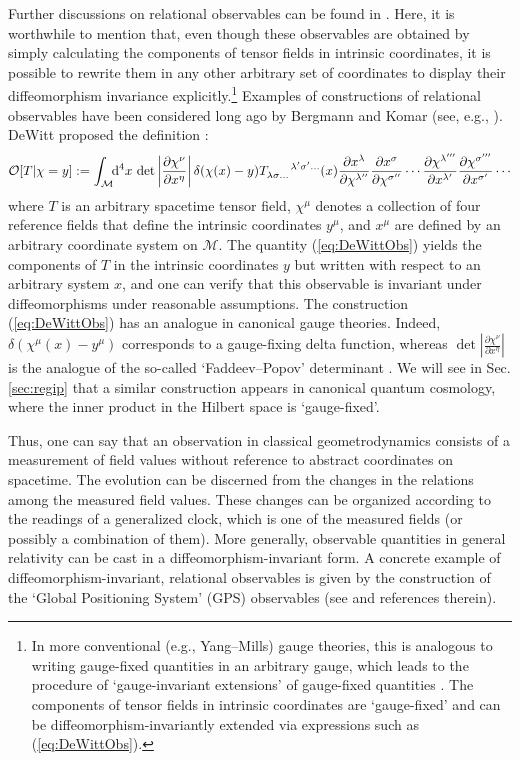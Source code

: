 \documentclass[12pt]{iopart}
\def\eq#1{\begin{equation}\begin{aligned}#1\end{aligned}\end{equation}}
\def\eref#1{(\ref{eq:#1})}
\def\D{\mathrm{d}}
\def\del#1#2{\frac{\partial#1}{\partial#2}}
\begin{document}
Further discussions on relational observables can be found in \cite{Dittrich:2005kc,Dittrich:2004cb,Dittrich:2006ee,Dittrich:2007jx,Tambornino:2011vg,Chataig:Thesis,Goeller:2022rsx}. Here, it is worthwhile to mention that, even though these observables are obtained by simply calculating the components of tensor fields in intrinsic coordinates, it is possible to rewrite them in any other arbitrary set of coordinates to display their diffeomorphism invariance explicitly.\footnote{In more conventional (e.g., Yang--Mills) gauge theories, this is analogous to writing gauge-fixed quantities in an arbitrary gauge, which leads to the procedure of `gauge-invariant extensions' of gauge-fixed quantities \citep{HT:book}. The components of tensor fields in intrinsic coordinates are `gauge-fixed' and can be diffeomorphism-invariantly extended via expressions such as \eref{DeWittObs}.} Examples of constructions of relational observables have been considered long ago by Bergmann and Komar (see, e.g., \cite{Komar:Motions,Komar:1958ymq,Bergmann:1960wb,Bergmann:1961wa,Komar:1971rg,Komar:1974ah}). DeWitt proposed the definition \citep{DeWitt:1962cg}:
\eq{\label{eq:DeWittObs}
\mathcal{O}[T|\chi = y] := \int_{\mathcal{M}}\!\!\D^4x\,\det\left|\frac{\partial \chi^{\nu}}{\partial x^{\eta}}\right|\delta(\chi(x)-y) \tensor{T}{_\lambda_\sigma_{\ldots}^{\lambda'\sigma'\ldots}}(x)\del{x^{\lambda}}{\chi^{\lambda''}}\del{x^{\sigma}}{\chi^{\sigma''}}\cdots\del{\chi^{\lambda'''}}{x^{\lambda'}}\del{\chi^{\sigma'''}}{x^{\sigma'}}\cdots
}
where $T$ is an arbitrary spacetime tensor field, $\chi^{\mu}$ denotes a collection of four reference fields that define the intrinsic coordinates $y^{\mu}$, and $x^{\mu}$ are defined by an arbitrary coordinate system on $\mathcal{M}$. The quantity \eref{DeWittObs} yields the components of $T$ in the intrinsic coordinates $y$ but written with respect to an arbitrary system $x$, and one can verify that this observable is invariant under diffeomorphisms under reasonable assumptions. The construction \eref{DeWittObs} has an analogue in canonical gauge theories. Indeed, $\delta(\chi^{\mu}(x)-y^{\mu})$ corresponds to a gauge-fixing delta function, whereas $\det\left|\frac{\partial \chi^{\nu}}{\partial x^{\eta}}\right|$ is the analogue of the so-called `Faddeev--Popov' determinant \citep{Faddeev:1967fc,Faddeev:1973zb,HT:book}. We will see in Sec. \ref{sec:regip} that a similar construction appears in canonical quantum cosmology, where the inner product in the Hilbert space is `gauge-fixed'.

Thus, one can say that an observation in classical geometrodynamics consists of a measurement of field values without reference to abstract coordinates on spacetime. The evolution can be discerned from the changes in the relations among the measured field values. These changes can be organized according to the readings of a generalized clock, which is one of the measured fields (or possibly a combination of them). More generally, observable quantities in general relativity can be cast in a diffeomorphism-invariant form. A concrete example of diffeomorphism-invariant, relational observables is given by the construction of the `Global Positioning System' (GPS) observables (see \cite{Rovelli:2001my,PhysRevD.65.044018}  and references therein).
\end{document}
